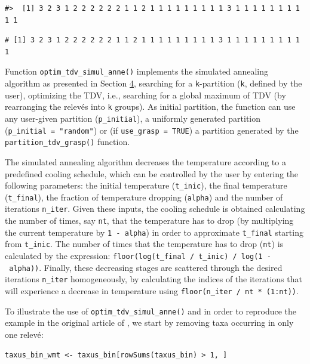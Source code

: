 \begin{verbatim}
#>  [1] 3 2 3 1 2 2 2 2 2 2 1 1 2 1 1 1 1 1 1 1 1 1 3 1 1 1 1 1 1 1 1 1 1
\end{verbatim}

\begin{verbatim}
# [1] 3 2 3 1 2 2 2 2 2 2 1 1 2 1 1 1 1 1 1 1 1 1 3 1 1 1 1 1 1 1 1 1 1
\end{verbatim}

Function \texttt{optim\_tdv\_simul\_anne()} implements the simulated annealing algorithm as presented in Section \hyperref[SA]{4}, searching for a \texttt{k}-partition (\texttt{k}, defined by the user), optimizing the TDV, i.e., searching for a global maximum of TDV (by rearranging the relevés into \texttt{k} groups). As initial partition, the function can use any user-given partition (\texttt{p\_initial}), a uniformly generated partition (\texttt{p\_initial\ =\ "random"}) or (if \texttt{use\_grasp\ =\ TRUE}) a partition generated by the \texttt{partition\_tdv\_grasp()} function.

The simulated annealing algorithm decreases the temperature according to a predefined cooling schedule, which can be controlled by the user by entering the following parameters: the initial temperature (\texttt{t\_inic}), the final temperature (\texttt{t\_final}), the fraction of temperature dropping (\texttt{alpha}) and the number of iterations \texttt{n\_iter}. Given these inputs, the cooling schedule is obtained calculating the number of times, say \texttt{nt}, that the temperature has to drop (by multiplying the current temperature by \texttt{1\ -\ alpha}) in order to approximate \texttt{t\_final} starting from \texttt{t\_inic}. The number of times that the temperature has to drop (\texttt{nt}) is calculated by the expression: \texttt{floor(log(t\_final\ /\ t\_inic)\ /\ log(1\ -\ alpha))}. Finally, these decreasing stages are scattered through the desired iterations \texttt{n\_iter} homogeneously, by calculating the indices of the iterations that will experience a decrease in temperature using \texttt{floor(n\_iter\ /\ nt\ *\ (1:nt))}.

To illustrate the use of \texttt{optim\_tdv\_simul\_anne()} and in order to reproduce the example in the original article of \citet{PEMCFGFN21}, we start by removing taxa occurring in only one relevé:

\begin{verbatim}
taxus_bin_wmt <- taxus_bin[rowSums(taxus_bin) > 1, ]
\end{verbatim}


